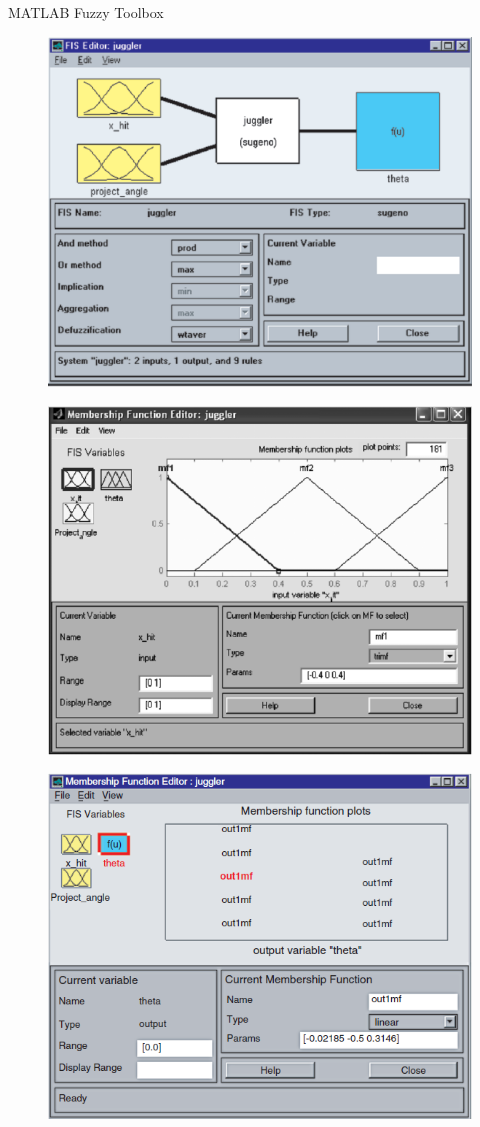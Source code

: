 \documentclass[hyperref={unicode}]{beamer}
\begin{document}
\begin{frame}[allowframebreaks]{MATLAB Fuzzy Toolbox}
	\begin{figure}
	\includegraphics[width=.75\textwidth]{sw-1}
	\end{figure}
	\begin{figure}
	\includegraphics[width=.75\textwidth]{sw-2}
	\end{figure}
	\begin{figure}
	\includegraphics[width=.75\textwidth]{sw-3}

\end{figure}
\end{frame}
\end{document}
